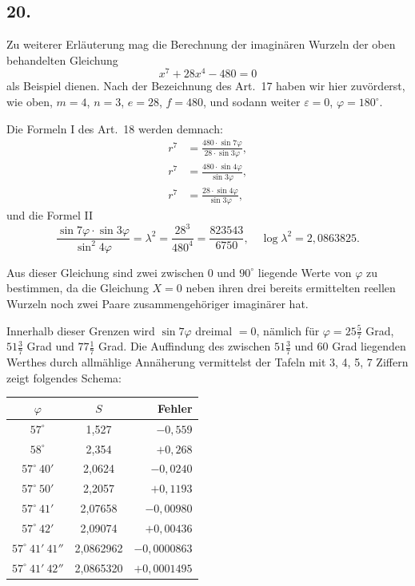 \documentclass[12pt,a4paper]{article}
\newcommand{\1}{\ensuremath{\mathrlap{\,|\,}}} %
\begin{document}
\subsection*{20.}

Zu weiterer Erläuterung mag die Berechnung der imaginären Wurzeln der oben behandelten Gleichung
\[x^7 + 28x^4 - 480 = 0\]
als Beispiel dienen. Nach der Bezeichnung des Art.~17 haben wir hier zuvörderst, wie oben, $m = 4$, $n = 3$, $e = 28$, $f = 480$, und sodann weiter $\varepsilon = 0$, $\varphi = 180^{\circ}$.

Die Formeln I des Art.~18 werden demnach:
\begin{align*}
r^7 &= \frac{480 \cdot \sin 7\varphi}{28 \cdot \sin 3\varphi},\\
r^7 &= \frac{480 \cdot \sin 4\varphi}{\sin 3\varphi},\\
r^7 &= \frac{28 \cdot \sin 4\varphi}{\sin 3\varphi},
\end{align*}
und die Formel II
\[\frac{\sin 7\varphi \cdot \sin 3\varphi}{\sin^2 4\varphi} = \lambda^2 = \frac{28^3}{480^4} = \frac{823543}{6750},\quad \log\lambda^2 = 2{,}0863825.\]

Aus dieser Gleichung sind zwei zwischen $0$ und $90^{\circ}$ liegende Werte von $\varphi$ zu bestimmen, da die Gleichung $X = 0$ neben ihren drei bereits ermittelten reellen Wurzeln noch zwei Paare zusammengehöriger imaginärer hat.

Innerhalb dieser Grenzen wird $\sin 7\varphi$ dreimal $= 0$, nämlich für $\varphi = 25\frac{5}{7}$ Grad, $51\frac{3}{7}$ Grad und $77\frac{1}{7}$ Grad. Die Auffindung des zwischen $51\frac{3}{7}$ und $60$ Grad liegenden Werthes durch allmählige Annäherung vermittelst der Tafeln mit 3, 4, 5, 7 Ziffern zeigt folgendes Schema:

\begin{center}
\begin{tabular}{ccr}
$\varphi$ & $S$ & Fehler \\ \midrule
$57^{\circ}$ & 1,527 & $-0{,}559$ \\
$58^{\circ}$ & 2,354 & $+0{,}268$ \\
$57^{\circ}\ 40'$ & 2,0624 & $-0{,}0240$ \\
$57^{\circ}\ 50'$ & 2,2057 & $+0{,}1193$ \\
$57^{\circ}\ 41'$ & 2,07658 & $-0{,}00980$ \\
$57^{\circ}\ 42'$ & 2,09074 & $+0{,}00436$ \\
$57^{\circ}\ 41'\ 41''$ & 2,0862962 & $-0{,}0000863$ \\
$57^{\circ}\ 41'\ 42''$ & 2,0865320 & $+0{,}0001495$
\end{tabular}
\end{center}
\end{document}
